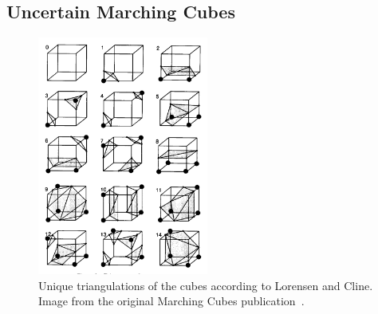 \subsection{Uncertain Marching Cubes}

\begin{figure}
  \centering
  \includegraphics[width=0.5\textwidth]{Images/MCTable.pdf}
  \caption{Unique triangulations of the cubes according to Lorensen and
  Cline. Image from the original Marching Cubes publication~\cite{MC}.}
  \label{fig:MCTable}
\end{figure}

